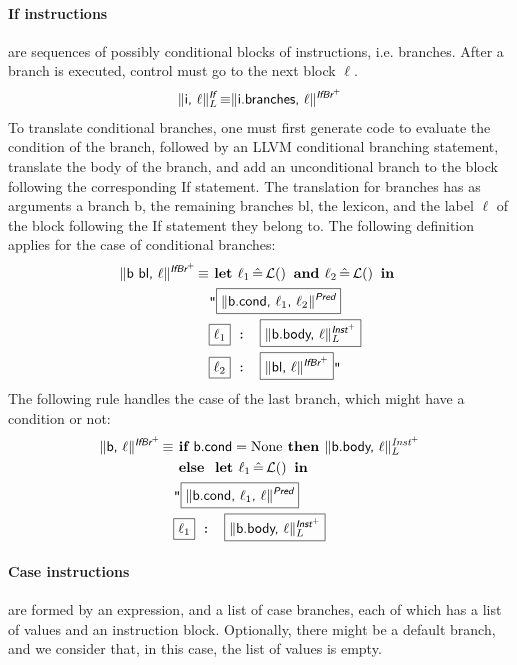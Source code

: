 \documentclass{article}
\newcommand{\trad}[2]{\ensuremath{\lVert \textsf{#1} \rVert^{\textit{#2}}}}
\DeclareMathOperator{\isdef}{\equiv}
\DeclareMathOperator{\lbl}{\mathcal{L}()}
\newcommand{\llvm}[1]{\texttt{#1}}
\newcommand{\B}[1]{\textsf{#1}}
\newcommand{\ListOf}[1]{$\mbox{#1}^+$}
\newcommand{\IF}[0]{\textbf{ if }}
\newcommand{\ELSE}[0]{\textbf{ else }}
\newcommand{\THEN}[0]{\textbf{ then }}
\newcommand{\LET}[0]{\textbf{ let }}
\DeclareMathOperator{\BE}{\hat{=}}
\newcommand{\IN}[0]{\textbf{ in }}
\newcommand{\AND}[0]{\textbf{ and }}
\newcommand{\PH}[1]{\framebox{$#1$}}
\begin{document}
\paragraph{If instructions} are sequences of possibly conditional blocks of
instructions, i.e. branches. After a branch is executed, control must go
to the next block $\ell$.
\begin{align*}
  \trad{i, $\ell$}{\B{If}}_L \isdef \trad{i.branches, $\ell$}{\ListOf{\B{IfBr}}}
\end{align*}
To translate conditional branches, one must first generate code to evaluate the
condition of the branch, followed by an LLVM conditional branching statement,
translate the body of the branch, and add an unconditional branch to the block
following the corresponding \B{If} statement.  The translation for branches has
as arguments a branch \B{b}, the remaining branches \B{bl}, the lexicon, and the
label $\ell$ of the block following the \B{If} statement they belong to. The
following definition applies for the case of conditional branches:
\begin{align*}
\begin{split}
  \trad{\B{b bl}, $\ell$}{\ListOf{\B{IfBr}}} \isdef & \LET \ell_1 \BE \lbl \AND \ell_2 \BE \lbl \IN \\
  & \llvm{"\PH{\trad{b.cond, $\ell_1$, $\ell_2$}{\B{Pred}}} } \\
  & \llvm{\PH{\ell_1} : \PH{\trad{b.body, $\ell$}{\ListOf{\B{Inst}}}_L}} \\
  & \llvm{\PH{\ell_2} : \PH{\trad{bl, $\ell$}{\ListOf{\B{IfBr}}}}"} \\
\end{split}
\end{align*}
The following rule handles the case of the last branch, which might have a condition or not:
\begin{align*}
\begin{split}
  \trad{\B{b}, $\ell$}{\ListOf{\B{IfBr}}} \isdef & \IF \B{b.cond} = \text{None} \THEN
  \trad{b.body, $\ell$}{\ListOf{Inst}}_L\\
  & \ELSE \LET \ell_1 \BE \lbl \IN \\
  & \llvm{"\PH{\trad{b.cond, $\ell_1$, $\ell$}{\B{Pred}}} } \\
  & \llvm{\PH{\ell_1} : \PH{\trad{b.body, $\ell$}{\ListOf{\B{Inst}}}_L}}
\end{split}
\end{align*}

\paragraph{Case instructions} are formed by an expression, and a list of case
branches, each of which has a list of values and an instruction block.
Optionally, there might be a default branch, and we consider that, in this case,
the list of values is empty.
\end{document}
